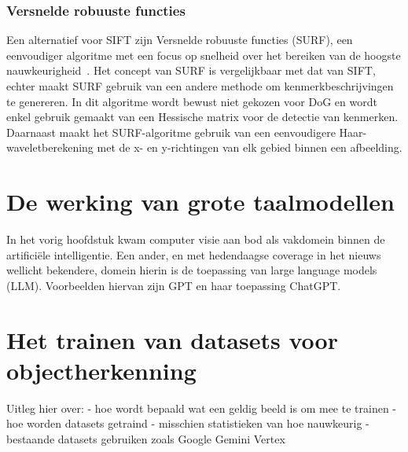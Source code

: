 \subsubsection{Versnelde robuuste functies}
Een alternatief voor SIFT zijn Versnelde robuuste functies (SURF), een eenvoudiger algoritme met een focus op snelheid over het bereiken van de hoogste nauwkeurigheid~\autocite{Wu2013}.
Het concept van SURF is vergelijkbaar met dat van SIFT, echter maakt SURF gebruik van een andere methode om kenmerkbeschrijvingen te genereren.
In dit algoritme wordt bewust niet gekozen voor DoG en wordt enkel gebruik gemaakt van een Hessische matrix voor de detectie van kenmerken.
Daarnaast maakt het SURF-algoritme gebruik van een eenvoudigere Haar-waveletberekening met de x- en y-richtingen van elk gebied binnen een afbeelding.


\section{De werking van grote taalmodellen}
\label{sec:ls-artificiele-intelligentie}
In het vorig hoofdstuk kwam computer visie aan bod als vakdomein binnen de artifici\"ele intelligentie.
Een ander, en met hedendaagse coverage in het nieuws wellicht bekendere, domein hierin is de toepassing van large language models (LLM).
Voorbeelden hiervan zijn GPT en haar toepassing ChatGPT. %

\section{Het trainen van datasets voor objectherkenning}\label{sec:datasets}
Uitleg hier over: %
- hoe wordt bepaald wat een geldig beeld is om mee te trainen
- hoe worden datasets getraind
- misschien statistieken van hoe nauwkeurig
- bestaande datasets gebruiken zoals Google Gemini Vertex
